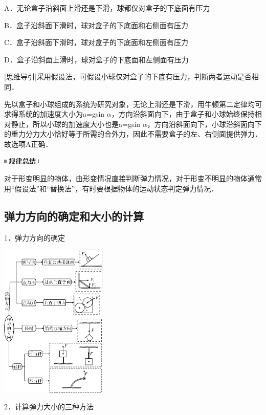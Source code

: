 A．无论盒子沿斜面上滑还是下滑，球都仅对盒子的下底面有压力

B．盒子沿斜面下滑时，球对盒子的下底面和右侧面有压力

C．盒子沿斜面下滑时，球对盒子的下底面和左侧面有压力

D．盒子沿斜面上滑时，球对盒子的下底面和左侧面有压力

{[}思维导引{]}采用假设法，可假设小球仅对盒子的下底有压力，判断两者运动是否相同．
\begin{solution}
	先以盒子和小球组成的系统为研究对象，无论上滑还是下滑，用牛顿第二定律均可求得系统的加速度大小为a=gsin
$\alpha$，方向沿斜面向下，由于盒子和小球始终保持相对静止，所以小球的加速度大小也是a=gsin
$\alpha$，方向沿斜面向下，小球沿斜面向下的重力分力大小恰好等于所需的合外力，因此不需要盒子的左、右侧面提供弹力．故选项A正确．
\end{solution}

\begin{center}\includegraphics[width=0.70833in,height=0.125in]{media/image44.png}\end{center}
对于形变明显的物体，由形变情况直接判断弹力情况，对于形变不明显的物体通常用``假设法''和``替换法''，有时要根据物体的运动状态判定弹力情况．

\subsection{弹力方向的确定和大小的计算}

1．弹力方向的确定

\begin{center}\includegraphics[width=2in]{media/image45.png}\end{center}
2．计算弹力大小的三种方法


